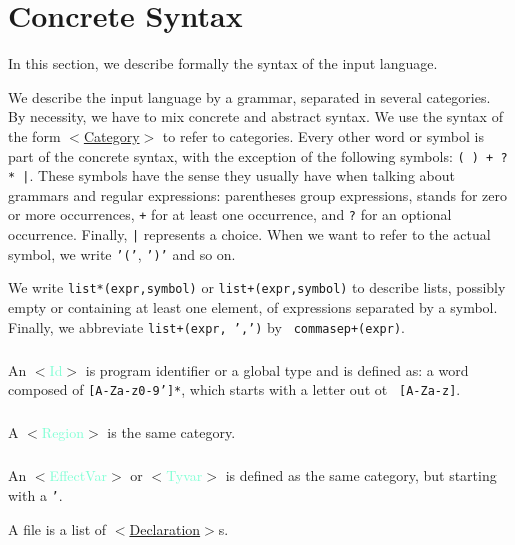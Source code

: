 \documentclass[a4paper]{scrreprt}
\newcommand{\cat}[1]{$<$\hyperref[#1]{#1}$>$}
\newcommand{\catdef}[1]{\label{#1}$<$\textcolor{Aquamarine}{#1}$>$}
\begin{document}
\chapter{Concrete Syntax}

In this section, we describe formally the syntax of the input language.

We describe the input language by a grammar, separated in several categories.
By necessity, we have to mix concrete and abstract syntax. We use the syntax
of the form \cat{Category} to refer to categories. Every other word or symbol
is part of the concrete syntax, with the exception of the following symbols:
\texttt{( ) + ? * |}. These symbols have the sense they usually have when
talking about grammars and regular expressions: parentheses group expressions,
{\tt *} stands for zero or more occurrences, {\tt +} for at least one
occurrence, and {\tt ?} for an optional occurrence. Finally, {\tt |}
represents a choice.  When we want to refer to the actual symbol, we write
{\tt '('}, {\tt ')'} and so on.

We write {\tt list*(expr,symbol)} or {\tt list+(expr,symbol)} to describe
lists, possibly empty or containing at least one element, of expressions
separated by a symbol. Finally, we abbreviate {\tt list+(expr, ',')} by {\tt
commasep+(expr)}.

\paragraph{}
An \catdef{Id} is program identifier or a global type and is defined as: a word
composed of {\tt [A-Za-z0-9']*}, which starts with a letter out ot {\tt
[A-Za-z]}.

\paragraph{}
A \catdef{Region} is the same category.

\paragraph{}
An \catdef{EffectVar} or \catdef{Tyvar} is defined as the same category, 
but starting with a {\tt '}.

A file is a list of \cat{Declaration}s.
\end{document}
